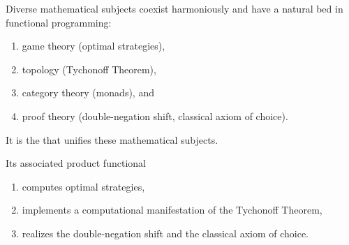 \documentclass%
[%
Screen4to3,
]{foils}
\begin{document}
Diverse mathematical subjects coexist harmoniously
and have a natural bed in functional programming: 
\begin{enumerate}
\item[\grey{1.}] 
game theory (optimal
strategies), 
\item[\grey{2.}]  topology (Tychonoff Theorem), 
\item[\grey{3.}]  category theory (monads),
and 
\item[\grey{4.}]  proof theory (double-negation shift, classical axiom
  of choice).
\end{enumerate}


It is the  that unifies these
mathematical subjects. 

\vfill

Its associated product
functional~\darkblue{$\bigotimes$}
\begin{enumerate}
\item[\grey{1.}]  
computes optimal strategies, 
\item[\grey{2.}]  implements a
computational manifestation of the Tychonoff Theorem, 
\item[\grey{3.}]  realizes the
double-negation shift and the classical axiom of choice. 
\end{enumerate}

\end{document}
